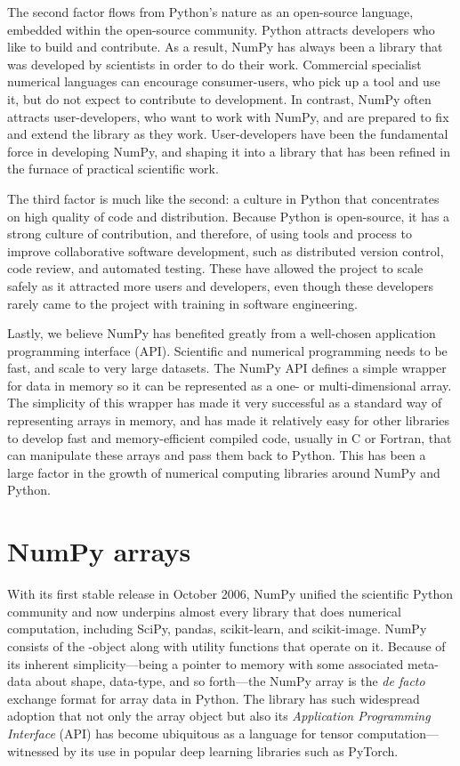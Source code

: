 The second factor flows from Python's nature as an open-source language,
embedded within the open-source community.  Python attracts developers who like
to build and contribute.  As a result, NumPy has always been a library that was
developed by scientists in order to do their work.  Commercial specialist
numerical languages can encourage consumer-users, who pick up a tool and use
it, but do not expect to contribute to development.  In contrast, NumPy often
attracts user-developers, who want to work with NumPy, and are prepared to fix
and extend the library as they work. User-developers have been the fundamental
force in developing NumPy, and shaping it into a library that has been refined
in the furnace of practical scientific work.

The third factor is much like the second: a culture in Python that concentrates
on high quality of code and distribution. Because Python is open-source, it has
a strong culture of contribution, and therefore, of using tools and process to
improve collaborative software development, such as distributed version
control, code review, and automated testing.  These have allowed the project to
scale safely as it attracted more users and developers, even though these
developers rarely came to the project with training in software engineering.

Lastly, we believe NumPy has benefited greatly from a well-chosen application
programming interface (API).  Scientific and numerical programming needs to be
fast, and scale to very large datasets.  The NumPy API defines a simple wrapper
for data in memory so it can be represented as a one- or multi-dimensional
array.  The simplicity of this wrapper has made it very successful as a
standard way of representing arrays in memory, and has made it relatively easy
for other libraries to develop fast and memory-efficient compiled code, usually
in C or Fortran, that can manipulate these arrays and pass them back to Python.
This has been a large factor in the growth of numerical computing libraries
around NumPy and Python.


\section*{NumPy arrays}


With its first stable release in October 2006, NumPy unified
the scientific Python community and now underpins almost every library
that does numerical computation, including SciPy\cite{virtanen2019scipy},
pandas\cite{mckinney-proc-scipy-2010}, scikit-learn\cite{pedregosa2011scikit},
and scikit-image\cite{vanderwalt2014scikit}.
NumPy consists of the -object along with utility functions that
operate on it.
Because of its inherent simplicity---being a pointer to memory with some
associated meta-data about shape, data-type, and so forth---the NumPy array is
the {\it de facto} exchange format for array data in Python.
The library has such widespread adoption that not only the array object but also its
{\it Application Programming Interface} (API) has become ubiquitous as
a language for tensor computation---witnessed by its use in popular
deep learning libraries such as PyTorch\cite{pytorch}.

